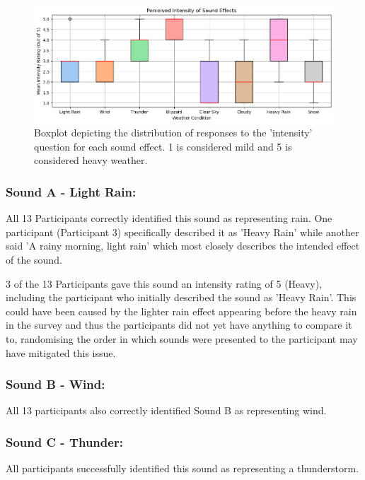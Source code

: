 \documentclass{l4proj}
\begin{document}
\begin{figure}
    \centering
    \includegraphics[width=\linewidth]{images/graphs/Intensities.png}
    \caption{Boxplot depicting the distribution of responses to the 'intensity' question for each sound effect.  1 is considered mild and 5 is considered heavy weather.}
    \label{fig:intensities_graph}
\end{figure}

\subsubsection{Sound A - Light Rain:}

All 13 Participants correctly identified this sound as representing rain. One participant (Participant 3) specifically described it as 'Heavy Rain' while another said 'A rainy morning, light rain' which most closely describes the intended effect of the sound.

3 of the 13 Participants gave this sound an intensity rating of 5 (Heavy), including the participant who initially described the sound as 'Heavy Rain'. This could have been caused by the lighter rain effect appearing before the heavy rain in the survey and thus the participants did not yet have anything to compare it to, randomising the order in which sounds were presented to the participant may have mitigated this issue.

\subsubsection{Sound B - Wind:}

All 13 participants also correctly identified Sound B as representing wind.

\subsubsection{Sound C - Thunder:}

All participants successfully identified this sound as representing a thunderstorm.
\end{document}
